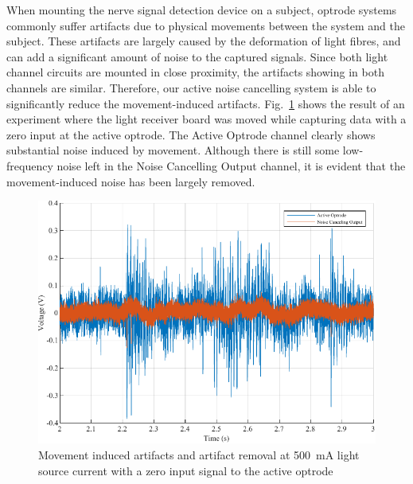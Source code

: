 When mounting the nerve signal detection device on a subject, optrode systems commonly suffer artifacts due to physical movements between the system and the subject.  These artifacts are largely caused by the deformation of light fibres, and can add a significant amount of noise to the captured signals.  Since both light channel circuits are mounted in close proximity, the artifacts showing in both channels are similar.  Therefore, our active noise cancelling system is able to significantly reduce the movement-induced artifacts.  Fig.~\ref{fig_Movement Artifact} shows the result of an experiment where the light receiver board was moved while capturing data with a zero input at the active optrode.  The Active Optrode channel clearly shows substantial noise induced by movement.  Although there is still some low-frequency noise left in the Noise Cancelling Output channel, it is evident that the movement-induced noise has been largely removed.

\begin{figure}[htbp]
\centerline{\includegraphics[scale=1]{5-Experiment/Movement Artifact.pdf}}
\caption{Movement induced artifacts and artifact removal at \qty{500}{\mA} light source current with a zero input signal to the active optrode}
\label{fig_Movement Artifact}
\end{figure}

